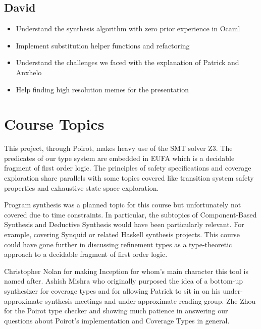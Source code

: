 \documentclass[review, sigplan]{acmart}
\begin{document}
\subsection{David}
\begin{itemize}
  \item Understand the synthesis algorithm with zero prior experience in Ocaml
  \item Implement substitution helper functions and refactoring
  \item Understand the challenges we faced with the explanation of Patrick and Anxhelo
  \item Help finding high resolution memes for the presentation
\end{itemize}

\section{Course Topics}
This project, through Poirot, makes heavy use of the SMT solver Z3. The
predicates of our type system are embedded in EUFA which is a decidable fragment
of first order logic. The principles of safety specifications and coverage
exploration share parallels with some topics covered like transition system
safety properties and exhaustive state space exploration.

Program synthesis was a planned topic for this course but unfortunately not
covered due to time constraints. In particular, the subtopics of Component-Based
Synthesis and Deductive Synthesis would have been particularly relevant. For
example, covering Synquid or related Haskell synthesis projects. This course
could have gone further in discussing refinement types as a type-theoretic
approach to a decidable fragment of first order logic.

\begin{acks}
  Christopher Nolan for making Inception for whom's main character this tool is
  named after.
  Ashish Mishra who originally purposed the idea of a bottom-up synthesizer
  for coverage types and for allowing Patrick to sit in on his
  under-approximate synthesis meetings and under-approximate reading group.
  Zhe Zhou for the Poirot type checker and showing much patience in answering
  our questions about Poirot's implementation and Coverage Types in general.
\end{acks}



\end{document}
